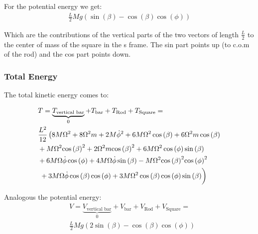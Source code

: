 For the potential energy we get:
\begin{equation}
    \begin{split}
        \frac{L}{2}Mg\left(\sin\left(\beta \right)-\cos\left(\beta \right)\cos\left(\phi \right)\right)
    \end{split}
\end{equation}

Which are the contributions of the vertical parts of the two vectors of length $\frac{L}{2}$ to the center of mass of the square in the s frame. The sin part points up (to c.o.m of the rod) and the cos part points down.

\subsubsection{Total Energy}
The total kinetic energy comes to:

\begin{equation}
    \begin{split}
        &T = \underbrace{T_\text{vertical bar}}_{0} + T_\text{bar} + T_\text{Rod} + T_\text{Square} = \\
        &\frac{L^2}{12}\left(8M\Omega ^2+8\Omega ^2m+2M{\mathrm{\dot\phi}}^2+6M\Omega ^2\cos\left(\beta \right)+6\Omega ^2m\cos\left(\beta \right)\right.\\
        &+M\Omega ^2{\cos\left(\beta \right)}^2+2\Omega ^2m{\cos\left(\beta \right)}^2+6M\Omega ^2\cos\left(\phi \right)\sin\left(\beta \right)\\
        &+6M\Omega \mathrm{\dot\phi}\cos\left(\phi \right)+4M\Omega \mathrm{\dot\phi}\sin\left(\beta \right)-M\Omega ^2{\cos\left(\beta \right)}^2{\cos\left(\phi \right)}^2\\
        &\left.\vphantom{\int}+3M\Omega \mathrm{\dot\phi}\cos\left(\beta \right)\cos\left(\phi \right)+3M\Omega ^2\cos\left(\beta \right)\cos\left(\phi \right)\sin\left(\beta \right)\right)
    \end{split}
\end{equation}

Analogous the potential energy:
\begin{equation}
    \begin{split}
        &V = \underbrace{V_\text{vertical bar}}_{0} + V_\text{bar} + V_\text{Rod} + V_\text{Square} = \\
        & \frac{L}{2}Mg\left(2\sin\left(\beta \right)-\cos\left(\beta \right)\cos\left(\phi \right)\right)
    \end{split}
\end{equation}

